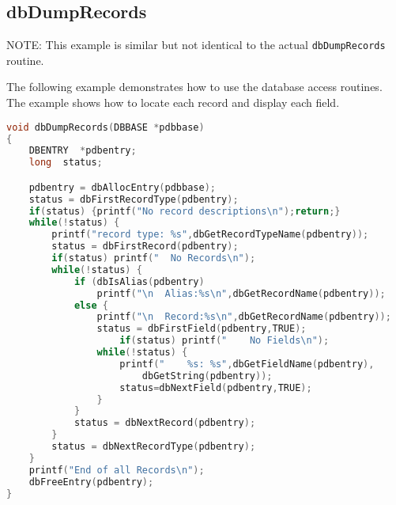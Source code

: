 \subsection{dbDumpRecords}

NOTE: This example is similar but not identical to the actual \verb|dbDumpRecords| routine.

The following example demonstrates how to use the database access routines.
The example shows how to locate each record and display each field.

\begin{lstlisting}[language=C]
void dbDumpRecords(DBBASE *pdbbase)
{
    DBENTRY  *pdbentry;
    long  status;

    pdbentry = dbAllocEntry(pdbbase);
    status = dbFirstRecordType(pdbentry);
    if(status) {printf("No record descriptions\n");return;}
    while(!status) {
        printf("record type: %s",dbGetRecordTypeName(pdbentry));
        status = dbFirstRecord(pdbentry);
        if(status) printf("  No Records\n"); 
        while(!status) {
            if (dbIsAlias(pdbentry)
                printf("\n  Alias:%s\n",dbGetRecordName(pdbentry));
            else {
                printf("\n  Record:%s\n",dbGetRecordName(pdbentry));
                status = dbFirstField(pdbentry,TRUE);
                    if(status) printf("    No Fields\n");
                while(!status) {
                    printf("    %s: %s",dbGetFieldName(pdbentry),
                        dbGetString(pdbentry));
                    status=dbNextField(pdbentry,TRUE);
                }
            }
            status = dbNextRecord(pdbentry);
        }
        status = dbNextRecordType(pdbentry);
    }
    printf("End of all Records\n");
    dbFreeEntry(pdbentry);
}
\end{lstlisting}
